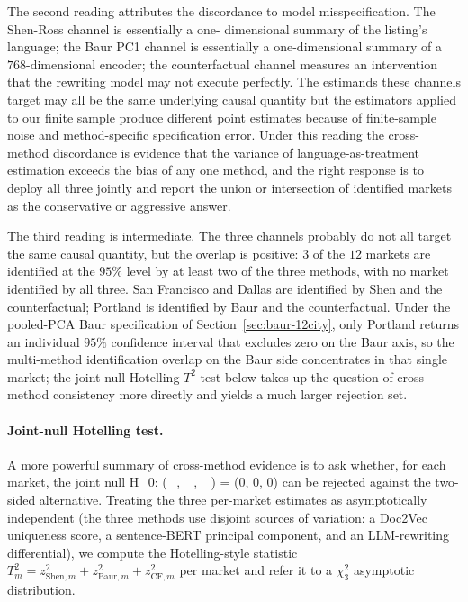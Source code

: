 The second reading attributes the discordance to model
misspecification. The Shen-Ross channel is essentially a one-
dimensional summary of the listing's language; the Baur PC1 channel
is essentially a one-dimensional summary of a $768$-dimensional
encoder; the counterfactual channel measures an intervention that
the rewriting model may not execute perfectly. The estimands these
channels target may all be the same underlying causal quantity but
the estimators applied to our finite sample produce different
point estimates because of finite-sample noise and method-specific
specification error. Under this reading the cross-method discordance
is evidence that the variance of language-as-treatment estimation
exceeds the bias of any one method, and the right response is to
deploy all three jointly and report the union or intersection of
identified markets as the conservative or aggressive answer.

The third reading is intermediate. The three channels probably
do not all target the same causal quantity, but the overlap is
positive: $3$ of the $12$ markets are identified at the $95\%$ level
by at least two of the three methods, with no market identified by
all three. San Francisco and Dallas are identified by Shen and the
counterfactual; Portland is identified by Baur and the
counterfactual.  Under the pooled-PCA Baur specification of
Section~\ref{sec:baur-12city}, only Portland returns an individual
$95\%$ confidence interval that excludes zero on the Baur axis, so
the multi-method identification overlap on the Baur side concentrates
in that single market; the joint-null Hotelling-$T^2$ test below
takes up the question of cross-method consistency more directly and
yields a much larger rejection set.

\paragraph{Joint-null Hotelling test.} A more powerful summary of
cross-method evidence is to ask whether, for each market, the joint
null  H_0: (\theta_{}, \theta_{},
\theta_{}) = (0, 0, 0) can be rejected against the two-
sided alternative.  Treating the three per-market estimates as
asymptotically independent (the three methods use disjoint sources
of variation: a Doc2Vec uniqueness score, a sentence-BERT principal
component, and an LLM-rewriting differential), we compute the
Hotelling-style statistic $T^2_m = z^2_{\mathrm{Shen},m} +
z^2_{\mathrm{Baur},m} + z^2_{\mathrm{CF},m}$ per market and refer it
to a $\chi^2_3$ asymptotic distribution.

